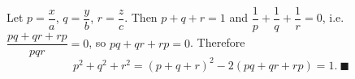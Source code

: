 Let $p=\dfrac xa$, $q=\dfrac yb$, $r=\dfrac zc$. Then $p+q+r=1$ and $\dfrac1p+\dfrac1q+\dfrac1r=0$, i.e. $\dfrac{pq+qr+rp}{pqr}=0$, so $pq+qr+rp=0$. Therefore
\[p^2+q^2+r^2=(p+q+r)^2-2(pq+qr+rp)=1.\ \blacksquare\]
